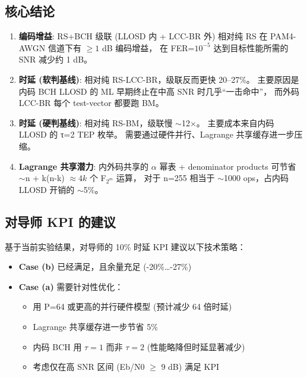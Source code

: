 \documentclass[11pt,a4paper]{article}
\begin{document}
\subsection{核心结论}

\begin{keybox}[title=\textbf{课题核心发现}]
\begin{enumerate}[leftmargin=1.5em, itemsep=2pt]
\item \textbf{编码增益}: RS+BCH 级联 (LLOSD 内 + LCC-BR 外) 相对纯 RS
      在 PAM4-AWGN 信道下有 $\geq 1$ dB 编码增益，
      在 FER=$10^{-5}$ 达到目标性能所需的 SNR 减少约 1 dB。

\item \textbf{时延 (软判基线)}: 相对纯 RS-LCC-BR，级联反而更快 20--27\%。
      主要原因是内码 BCH LLOSD 的 ML 早期终止在中高 SNR 时几乎``一击命中''，
      而外码 LCC-BR 每个 test-vector 都要跑 BM。

\item \textbf{时延 (硬判基线)}: 相对纯 RS-BM，级联慢 $\sim$12$\times$。
      主要成本来自内码 LLOSD 的 τ=2 TEP 枚举。
      需要通过硬件并行、Lagrange 共享缓存进一步压缩。

\item \textbf{Lagrange 共享潜力}: 内外码共享的 $\alpha$ 幂表 + denominator
      products 可节省 $\sim$n + k(n-k) $\approx 4k$ 个 F$_{2^m}$ 运算，
      对于 n=255 相当于 $\sim$1000 ops，占内码 LLOSD 开销的 $\sim$5\%。
\end{enumerate}
\end{keybox}

\subsection{对导师 KPI 的建议}

基于当前实验结果，对导师的 10\% 时延 KPI 建议以下技术策略：

\begin{itemize}[leftmargin=1.5em, itemsep=1pt]
\item \textbf{Case (b)} 已经满足，且余量充足 (-20\%\ldots-27\%)
\item \textbf{Case (a)} 需要针对性优化：
  \begin{itemize}[leftmargin=1em]
  \item 用 P=64 或更高的并行硬件模型 (预计减少 64 倍时延)
  \item Lagrange 共享缓存进一步节省 5\%
  \item 内码 BCH 用 $\tau=1$ 而非 $\tau=2$ (性能略降但时延显著减少)
  \item 考虑仅在高 SNR 区间 (Eb/N0 $\geq$ 9 dB) 满足 KPI
  \end{itemize}
\end{itemize}
\end{document}
